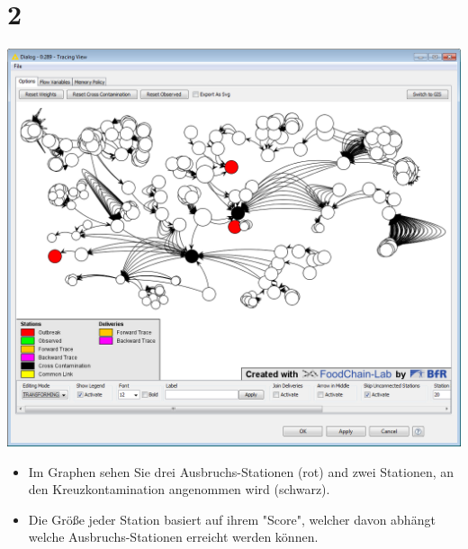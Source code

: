 \documentclass{beamer}
\begin{document}
\section{2}
\begin{frame}
	\begin{center}
  		\includegraphics[height=0.6\textheight]{2.png}
	\end{center}
	\begin{itemize}
		\item Im Graphen sehen Sie drei Ausbruchs-Stationen (rot) and zwei Stationen, an den Kreuzkontamination angenommen wird (schwarz).
		\item Die Größe jeder Station basiert auf ihrem "Score", welcher davon abhängt welche Ausbruchs-Stationen erreicht werden können.
	\end{itemize}
\end{frame}
\end{document}
